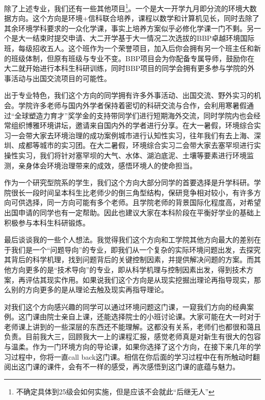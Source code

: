 \documentclass[11pt,oneside]{book}
\begin{document}
\vspace{10pt}

除了上述专业，我们还有一些其他项目\footnote{不确定具体到25级会如何实施，但是应该不会就此“后继无人”}。一个是大一开学九月即分流的环境大数据方向。这个方向是环境+信科联合培养，课程以数学和计算机见长，同时去除了其余环境学科要求的一众化学课，事实上培养方案似乎必修化学课一门不剩。另一个是大一结束时提交申请、大二开学基于大一情况二次选拔的BBP卓越环境国际班，每级招收五人。这个班作为一个荣誉项目，加入后你会拥有另一个班主任和新的班级体制，但原有班级与专业不变。BBP项目会为你配备专属导师，鼓励你在大二就开始进行本科生科研训练，同时BBP项目的同学会拥有更多参与学院的外事活动与出国交流项目的可能性。

\vspace{10pt}

出于专业特色，我们这个方向的同学拥有许多外事活动、出国交流、野外实习的机会。学院许多老师与国内外学者保持着密切的科研交流与合作，会利用寒暑假通过“全球塑造力育才”奖学金的支持带同学们进行短期海外交流，同时学院内也会经常组织博雅环境讲坛，邀请来自国内外的学者进行分享。在大一暑假，环境综合实习一会带大家去环境治理的成功案例城市进行认知性实习，往年我们有去上海、深圳、成都等城市的实习团。在大二暑假，环境综合实习二会带大家去塞罕坝进行实操性实习，我们将针对塞罕坝的大气、水体、湖泊底泥、土壤等要素进行环境监测，亲身体会环境治理带来的成效，感悟环境人的使命担当。

\vspace{10pt}

作为一个研究型院系的学生，我们这个方向大部分同学的首要选择是升学科研。学院很长一段时间呈本科生比老师少的倒三角型结构，保研竞争相对较小，有许多方向可供选择，同一方向可能有多个老师。且学院老师的背景国际化程度高，对希望出国申请的同学也有一定帮助。因此也建议大家在本科阶段在平衡好学业的基础上积极参与本科生科研锻炼。

\vspace{10pt}

最后谈谈我的一些个人想法。我觉得我们这个方向和工学院其他方向最大的差别在于我们是一个“问题导向”的专业，即我们从一个复杂的实际环境问题出发，去探究其背后的科学机理，找到问题背后的关键控制因素，并提供解决问题的方案。而其他方向更多的是“技术导向”的专业，即从科学机理与控制因素出发，得到技术方案，再评估其现实作用。如果说我们这个方向是从现实挖掘出理论再指导现实，那么别的方向更多的是从理论去触及现实再指导理论。

\vspace{10pt}

对我们这个方向感兴趣的同学可以通过环境问题这门课，一窥我们方向的经典案例。这门课由院士亲自上课，还能选择院士的小班讨论课。大家可能在大一时对于老师课上讲到的一些深层的东西还不能理解。这都没有关系，老师们也都很和蔼且负责。目前我大三，回顾我大一上的课程汇报，感觉老师真是对新生有很大的包容与温柔。作为一门环境方向的导论课，如果你选择了这个方向，在接下来几年的学习过程中，你将一直call back这门课。相信在你后面的学习过程中在有所触动时翻阅出这门课的课件，会有不一样的感受，再次感悟到这门课的底蕴与魅力。
\end{document}
